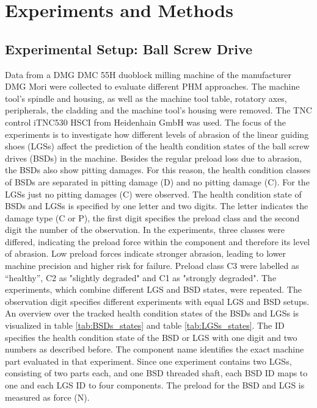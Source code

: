 \chapter{Experiments and Methods}\label{chapter:experiments}

\section{Experimental Setup: Ball Screw Drive}
Data from a DMG DMC 55H duoblock milling machine of the manufacturer DMG Mori were collected to evaluate different PHM approaches. The machine tool’s spindle and housing, as well as the machine tool table, rotatory axes, peripherals, the cladding and the machine tool's housing were removed. The TNC control iTNC530 HSCI from Heidenhain GmbH was used. The focus of the experiments is to investigate how different levels of abrasion of the linear guiding shoes (LGSs) affect the prediction of the health condition states of the ball screw drives (BSDs) in the machine. Besides the regular preload loss due to abrasion, the BSDs also show pitting damages. For this reason, the health condition classes of BSDs are separated in pitting damage (D) and no pitting damage (C). For the LGSs just no pitting damages (C) were observed. The health condition state of BSDs and LGSs is specified by one letter and two digits. The letter indicates the damage type (C or P), the first digit specifies the preload class and the second digit the number of the observation. In the experiments, three classes were differed, indicating the preload force within the component and therefore its level of abrasion. Low preload forces indicate stronger abrasion, leading to lower machine precision and higher risk for failure. Preload class C3 were labelled as “healthy”, C2 as "slightly degraded" and C1 as "strongly degraded". The experiments, which combine different LGS and BSD states, were repeated. The observation digit specifies different experiments with equal LGS and BSD setups. An overview over the tracked health condition states of the BSDs and LGSs is visualized in table \ref {tab:BSDs_states} and table \ref {tab:LGSs_states}. The ID specifies the health condition state of the BSD or LGS with one digit and two numbers as described before. The component name identifies the exact machine part evaluated in that experiment. Since one experiment contains two LGSs, consisting of two parts each, and one BSD threaded shaft, each BSD ID maps to one and each LGS ID to four components. The preload for the BSD and LGS is measured as force (N).


